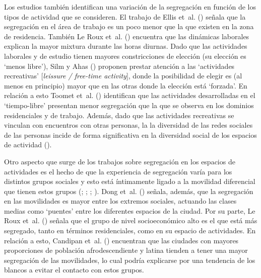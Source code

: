 \documentclass[
  spanish,
  a4paper,%
  chapterprefix=true,%
  DIV=calc,%
  twoside]{scrbook}%
\begin{document}
Los estudios también identifican una variación de la segregación en
función de los tipos de actividad que se consideren. El trabajo de
Ellis et~al. () señala que la segregación en el área de trabajo es un poco
menor que la que existen en la zona de residencia. También Le Roux et~al. ()
encuentra que las dinámicas laborales explican la mayor mixtura durante
las horas diurnas. Dado que las actividades laborales y de estudio
tienen mayores constricciones de elección (su elección es `menos
libre'), Silm y Ahas () proponen prestar atención a las `actividades
recreativas' {[}\emph{leissure / free-time activity}{]}, donde la posibilidad de
elegir es (al menos en principio) mayor que en las otras donde la
elección está `forzada'. En relación a esto Toomet et~al. () identifican que
las actividades desarrolladas en el `tiempo-libre' presentan menor
segregación que la que se observa en los dominios residenciales y de
trabajo. Además, dado que las actividades recreativas se vinculan con
encuentros con otras personas, la la diversidad de las redes sociales de
las personas incide de forma significativa en la diversidad social de
los espacios de actividad ().

Otro aspecto que surge de los trabajos sobre segregación en los espacios
de actividades es el hecho de que la experiencia de segregación varía
para los distintos grupos sociales y esto está íntimamente ligado a la
movilidad diferencial que tienen estos grupos (; ; ; ). Dong et~al. () señala, además, que la segregación
en las movilidades es mayor entre los extremos sociales, actuando las
clases medias como `puentes' entre los diferentes espacios de la ciudad.
Por su parte, Le Roux et~al. () señala que el grupo de nivel socioeconómico
alto es el que está más segregado, tanto en términos residenciales, como
en su espacio de actividades. En relación a esto, Candipan et~al. ()
encuentran que las ciudades con mayores proporciones de población
afrodescendiente y latina tienden a tener una mayor segregación de las
movilidades, lo cual podría explicarse por una tendencia de los blancos
a evitar el contacto con estos grupos.
\end{document}

